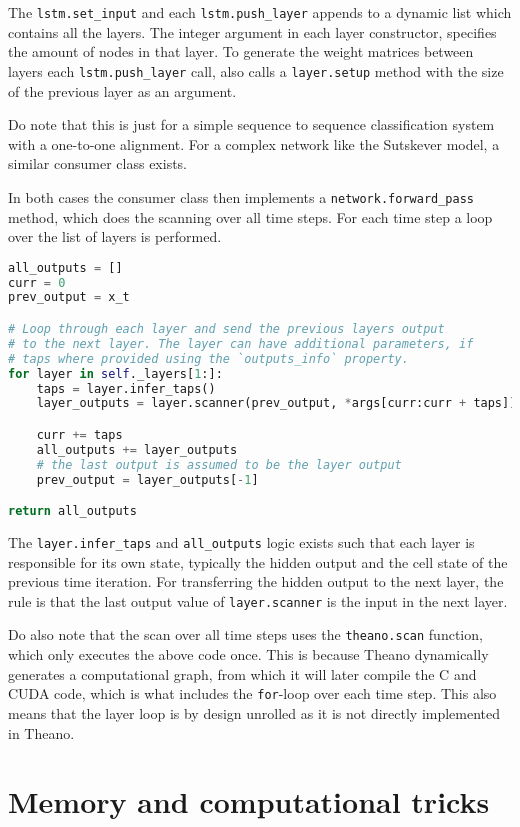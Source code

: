 The \texttt{lstm.set\_input} and each \texttt{lstm.push\_layer} appends to a dynamic list which contains all the layers. The integer argument in each layer constructor, specifies the amount of nodes in that layer. To generate the weight matrices between layers each \texttt{lstm.push\_layer} call, also calls a \texttt{layer.setup} method with the size of the previous layer as an argument.

Do note that this is just for a simple sequence to sequence classification system with a one-to-one alignment. For a complex network like the Sutskever model, a similar consumer class exists.

In both cases the consumer class then implements a \texttt{network.forward\_pass} method, which does the scanning over all time steps. For each time step a loop over the list of layers is performed.
\begin{lstlisting}[language=Python]
all_outputs = []
curr = 0
prev_output = x_t

# Loop through each layer and send the previous layers output
# to the next layer. The layer can have additional parameters, if
# taps where provided using the `outputs_info` property.
for layer in self._layers[1:]:
    taps = layer.infer_taps()
    layer_outputs = layer.scanner(prev_output, *args[curr:curr + taps])

    curr += taps
    all_outputs += layer_outputs
    # the last output is assumed to be the layer output
    prev_output = layer_outputs[-1]

return all_outputs
\end{lstlisting}

The \texttt{layer.infer\_taps} and \texttt{all\_outputs} logic exists such that each layer is responsible for its own state, typically the hidden output and the cell state of the previous time iteration. For transferring the hidden output to the next layer, the rule is that the last output value of \texttt{layer.scanner} is the input in the next layer.

Do also note that the scan over all time steps uses the \texttt{theano.scan} function, which only executes the above code once. This is because Theano dynamically generates a computational graph, from which it will later compile the C and CUDA code, which is what includes the \texttt{for}-loop over each time step. This also means that the layer loop is by design unrolled as it is not directly implemented in Theano.

\section{Memory and computational tricks}

